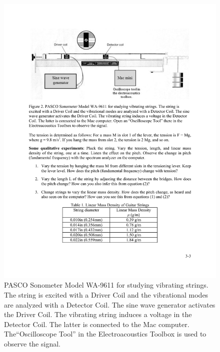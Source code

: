 \documentclass[11pt]{NSF}
\begin{document}
\begin{figure}[hbtp] 
\begin{center} 
\includegraphics[width=\textwidth]{fig3_2}
\caption{PASCO Sonometer Model WA-9611 for studying vibrating strings. The
string is excited with a Driver Coil and the vibrational modes are analyzed
with a Detector Coil. The sine wave generator activates the Driver Coil. The
vibrating string induces a voltage in the Detector Coil. The latter is
connected to the Mac computer. The``Oscilloscope Tool” in the
Electroacoustics Toolbox is used to observe the signal.} 
\label{f:2} 
\end{center} 
\end{figure}
%
%
\end{document}
